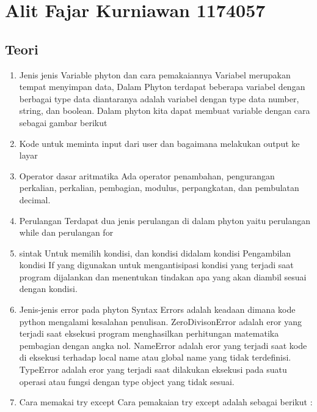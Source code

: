 
\section{Alit Fajar Kurniawan 1174057}
\subsection{Teori}
\begin{enumerate}
    \item Jenis jenis Variable phyton dan cara pemakaiannya 
	Variabel merupakan tempat menyimpan data, Dalam Phyton terdapat beberapa variabel dengan berbagai type data diantaranya adalah variabel dengan type data number, string, dan boolean. 
	Dalam phyton kita dapat membuat variable dengan cara sebagai gambar berikut
    \item Kode untuk meminta input dari user dan bagaimana melakukan output ke layar
    \item Operator dasar aritmatika
	Ada operator penambahan, pengurangan perkalian, perkalian, pembagian, modulus, perpangkatan, dan pembulatan decimal.
    \item Perulangan
	Terdapat dua jenis perulangan di dalam phyton yaitu perulangan while dan perulangan for
    \item sintak Untuk memilih kondisi, dan kondisi didalam kondisi
	Pengambilan kondisi If yang digunakan untuk mengantisipasi kondisi yang terjadi saat program dijalankan dan menentukan tindakan apa yang akan diambil sesuai dengan kondisi.

    \item Jenis-jenis error pada phyton
Syntax Errors adalah keadaan dimana kode python mengalami kesalahan penulisan. 
ZeroDivisonError adalah eror yang terjadi saat eksekusi program menghasilkan perhitungan matematika pembagian dengan angka nol.
NameError adalah eror yang terjadi saat kode di eksekusi terhadap local name atau global name yang tidak terdefinisi. 
TypeError adalah eror yang terjadi saat dilakukan eksekusi pada suatu operasi atau fungsi dengan type object yang tidak sesuai.

    \item Cara memakai try except
Cara pemakaian try except adalah sebagai berikut :

\end{enumerate}

